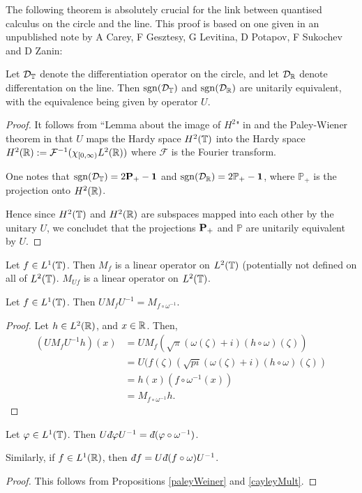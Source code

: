 The following theorem is absolutely crucial for the link
between quantised calculus on the circle and the line.
This proof is based on one given in an unpublished note by A
Carey, F Gesztesy, G Levitina, D Potapov, F Sukochev and D Zanin:
\begin{proposition}
\label{paleyWeiner}
    Let $\mathcal{D}_{\mathbb{T}}$ denote the differentiation operator on the circle,
    and let $\mathcal{D}_{\mathbb{R}}$ denote differentation on the line. Then $\operatorname{sgn}(\mathcal{D}_{\mathbb{T}})$
    and $\operatorname{sgn}(\mathcal{D}_{\mathbb{R}})$ are unitarily equivalent, with the equivalence being
    given by operator $U$.
    
\end{proposition}
\begin{proof}
    It follows from ``Lemma about the image of $H^2$" in \cite[p. 253]{nikolskii}
    and the Paley-Wiener theorem in \cite[p.254]{nikolskii}
    that $U$ maps the Hardy space $H^2(\mathbb{T})$
    into the Hardy space $H^2(\mathbb{R}) := \mathcal{F}^{-1}(\chi_{[0,\infty)}L^2(\mathbb{R}))$
    where $\mathcal{F}$ is the Fourier transform. 
    
    One notes that $\operatorname{sgn}(\mathcal{D}_{\mathbb{T}}) = 2\mathbf{P}_+-\mathbf{1}$ and $\operatorname{sgn}(\mathcal{D}_{\mathbb{R}}) = 2\mathbb{P}_+-\mathbf{1}$,
    where $\mathbb{P}_+$ is the projection onto $H^2(\mathbb{R})$. 
    
    Hence since $H^2(\mathbb{T})$ and $H^2(\mathbb{R})$ are subspaces mapped into each other
    by the unitary $U$, we concludet that the projections $\mathbf{P}_+$
    and $\mathbb{P}$
    are unitarily equivalent by $U$.
\end{proof} 

\begin{remark}
    Let $f \in L^1(\mathbb{T})$. Then $M_f$ is a
    linear operator on $L^2(\mathbb{T})$ (potentially not defined
    on all of $L^2(\mathbb{T})$. $M_{Uf}$ is a linear operator on
    $L^2(\mathbb{T})$.
\end{remark}

\begin{proposition}
\label{cayleyMult}
    Let $f \in L^1(\mathbb{T})$. Then $UM_fU^{-1} = M_{f\circ\omega^{-1}}$. 
\end{proposition}
\begin{proof}
    Let $h \in L^2(\mathbb{R})$, and $x \in \mathbb{R}$. Then,
    \begin{align}
        (UM_fU^{-1}h)(x) &= UM_f(\sqrt{\pi}(\omega(\zeta)+i)(h\circ\omega)(\zeta))\\
        &= U(f(\zeta)(\sqrt{pi}(\omega(\zeta)+i)(h\circ\omega)(\zeta))\\
        &= h(x)(f\circ\omega^{-1}(x))\\
        &= M_{f\circ \omega^{-1}}h.
    \end{align}
\end{proof}

\begin{proposition}
\label{cayley}
    Let $\varphi \in L^1(\mathbb{T})$. Then $U\qd \varphi U^{-1} = \qd (\varphi\circ \omega^{-1})$.
    
    Similarly, if $f \in L^1(\mathbb{R})$, then $\qd f = U\qd (f\circ\omega) U^{-1}$.
\end{proposition}
\begin{proof}
    This follows from Propositions \ref{paleyWeiner} and \ref{cayleyMult}.
\end{proof}


